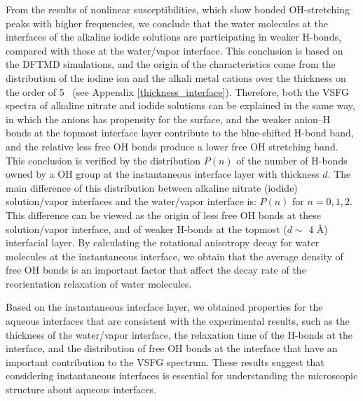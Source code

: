 From the results of nonlinear susceptibilities, which show bonded OH-stretching peaks with higher frequencies, 
we conclude that the water molecules at the interfaces of the alkaline iodide solutions are participating 
in weaker H-bonds, compared with those at the water/vapor interface. 
This conclusion is based on the DFTMD simulations, and %
the origin of the characteristics come from the distribution of the iodine ion and the alkali metal cations
over the thickness on the order of 5 \A\ (see Appendix \ref{thickness_interface}).
Therefore, both the VSFG spectra of alkaline nitrate and iodide solutions can be explained in the same way, 
in which the anions has propensity for the surface, and the weaker anion--H bonds at the topmost interface layer contribute to the blue-shifted H-bond band,
and the relative less free OH bonds produce a lower free OH stretching band.
This conclusion is verified by the distribution $P(n)$ of the number of H-bonds owned by a OH group at the instantaneous interface layer with thickness $d$. 
The main difference of this distribution between alkaline nitrate (iodide) solution/vapor interfaces and the water/vapor interface is:
$P(n)$ for $n= 0, 1, 2$. This difference can be viewed as the origin of less free OH bonds at these solution/vapor interface, 
and of weaker H-bonds at the topmost ($d \sim$ 4 \AA) interfacial layer.
By calculating the rotational anisotropy decay for water molecules at the instantaneous interface, 
we obtain that the average density of free OH bonds is an important factor that affect the decay rate of the reorientation relaxation of water molecules.

Based on the instantaneous interface layer, we obtained properties for the aqueous interfaces that are consistent with the experimental results, 
such as the thickness of the water/vapor interface, the relaxation time of the H-bonds at the interface, 
and the distribution of free OH bonds at the interface that have an important contribution to the VSFG spectrum.
These results suggest that considering instantaneous interfaces is essential for understanding the microscopic structure about aqueous interfaces.

